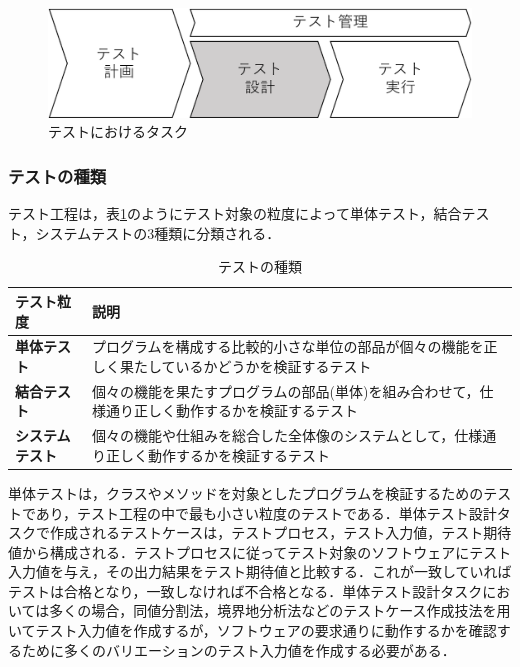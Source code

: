 \documentclass[12pt]{jarticle} %
\begin{document}
\begin{figure}[htbp]
  \begin{center}
    \includegraphics[clip,width=12cm]{test-task.pdf}
    \caption{テストにおけるタスク}
    \label{fig:1}
  \end{center}
\end{figure}

\subsubsection{テストの種類}

テスト工程は，表\ref{test-variety}のようにテスト対象の粒度によって単体テスト，結合テスト，システムテストの3種類に分類される．

\begin{table}[t]
\caption{テストの種類}
\label{test-variety}
\begin{tabular}{|l|p{11cm}|}
\hline
\textbf{テスト粒度}                   & \textbf{説明}                                                                                                       \\ \hline
\textbf{単体テスト}        & プログラムを構成する比較的小さな単位の部品が個々の機能を正しく果たしているかどうかを検証するテスト \\ \hline
\textbf{結合テスト} & 個々の機能を果たすプログラムの部品(単体)を組み合わせて，仕様通り正しく動作するかを検証するテスト\\ \hline
\textbf{システムテスト}            & 個々の機能や仕組みを総合した全体像のシステムとして，仕様通り正しく動作するかを検証するテスト \\ \hline
\end{tabular}
\end{table}

単体テストは，クラスやメソッドを対象としたプログラムを検証するためのテストであり，テスト工程の中で最も小さい粒度のテストである．単体テスト設計タスクで作成されるテストケースは，テストプロセス，テスト入力値，テスト期待値から構成される．テストプロセスに従ってテスト対象のソフトウェアにテスト入力値を与え，その出力結果をテスト期待値と比較する．これが一致していればテストは合格となり，一致しなければ不合格となる．単体テスト設計タスクにおいては多くの場合，同値分割法，境界地分析法などのテストケース作成技法を用いてテスト入力値を作成するが，ソフトウェアの要求通りに動作するかを確認するために多くのバリエーションのテスト入力値を作成する必要がある．
\end{document}
